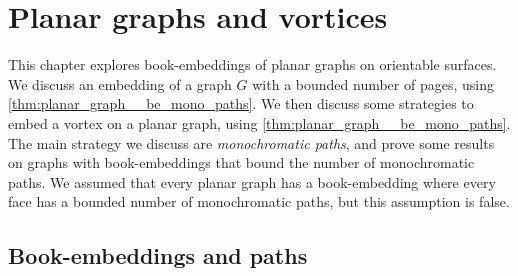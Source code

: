 \chapter{Planar graphs and vortices}\label{chap:planar}

This chapter explores book-embeddings of planar graphs on orientable surfaces. 
We discuss an embedding of a graph $G$ with a bounded number of pages, using \cref{thm:planar_graph__be_mono_paths}. We then discuss some strategies to embed a vortex on a planar graph, using \cref{thm:planar_graph__be_mono_paths}. The main strategy we discuss are \textit{monochromatic paths}, and prove some results on graphs with book-embeddings that bound the number of monochromatic paths. We assumed that every planar graph has a book-embedding where every face has a bounded number of monochromatic paths, but this assumption is false. 



\section{Book-embeddings and paths}

